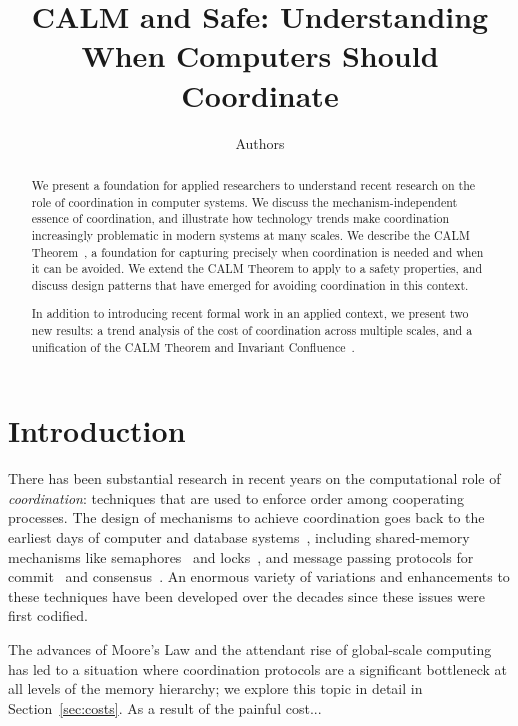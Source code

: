 \documentclass{sig-alternate}
\begin{document}
\title{CALM and Safe: Understanding When Computers Should Coordinate}

\author{
Authors
}

\maketitle

\begin{abstract}
We present a foundation for applied researchers to understand recent research on the role of coordination in computer systems.  We discuss the mechanism-independent essence of coordination, and illustrate how technology trends make coordination increasingly problematic in modern systems at many scales.  We describe the CALM Theorem~\cite{}, a foundation for capturing precisely when coordination is needed and when it can be avoided.  We extend the CALM Theorem to apply to a safety properties, and discuss design patterns that have emerged for avoiding coordination in this context.  

In addition to introducing recent formal work in an applied context, we present two new results: a trend analysis of the cost of coordination across multiple scales, and a unification of the CALM Theorem and Invariant Confluence~\cite{}.  
\end{abstract}

\section{Introduction}
There has been substantial research in recent years on the computational role of \emph{coordination}: techniques that are used to enforce order among cooperating processes.  The design of mechanisms to achieve coordination goes back to the earliest days of computer and database systems~\cite{grayreuter,seminalosbook}, including shared-memory mechanisms like semaphores~\cite{semaphores} and locks~\cite{2pl}, and message passing protocols for commit~\cite{2pl,3pl} and consensus~\cite{paxos,virtualsynchrony}.  An enormous variety of variations and enhancements to these techniques have been developed over the decades since these issues were first codified.

The advances of Moore's Law and the attendant rise of global-scale computing has led to a situation where coordination protocols are a significant bottleneck at all levels of the memory hierarchy; we explore this topic in detail in Section~\ref{sec:costs}.  As a result of the painful cost...
\end{document}
